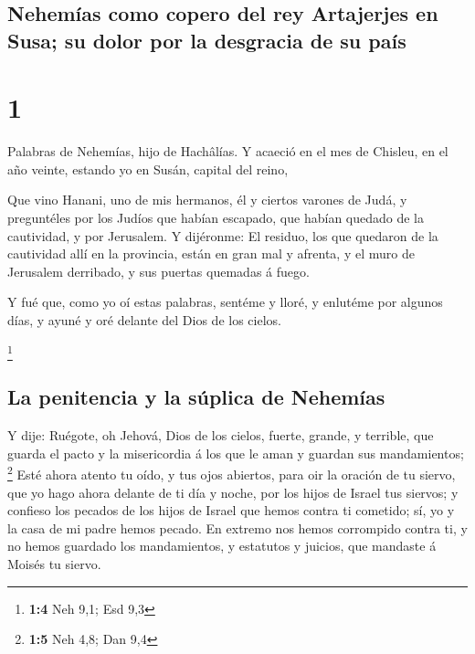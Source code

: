 \hypertarget{nehemuxedas-como-copero-del-rey-artajerjes-en-susa-su-dolor-por-la-desgracia-de-su-pauxeds}{%
\subsection{Nehemías como copero del rey Artajerjes en Susa; su dolor
por la desgracia de su
país}\label{nehemuxedas-como-copero-del-rey-artajerjes-en-susa-su-dolor-por-la-desgracia-de-su-pauxeds}}

\hypertarget{section}{%
\section{1}\label{section}}

 Palabras de Nehemías, hijo de Hachâlías. Y acaeció en el
mes de Chisleu, en el año veinte, estando yo en Susán, capital del
reino,

 Que vino Hanani, uno de mis hermanos, él y ciertos
varones de Judá, y preguntéles por los Judíos que habían escapado, que
habían quedado de la cautividad, y por Jerusalem.  Y
dijéronme: El residuo, los que quedaron de la cautividad allí en la
provincia, están en gran mal y afrenta, y el muro de Jerusalem
derribado, y sus puertas quemadas á fuego.

 Y fué que, como yo oí estas palabras, sentéme y lloré, y
enlutéme por algunos días, y ayuné y oré delante del Dios de los cielos.

\footnote{\textbf{1:4} Neh 9,1; Esd 9,3}

\hypertarget{la-penitencia-y-la-suxfaplica-de-nehemuxedas}{%
\subsection{La penitencia y la súplica de
Nehemías}\label{la-penitencia-y-la-suxfaplica-de-nehemuxedas}}

 Y dije: Ruégote, oh Jehová, Dios de los cielos, fuerte,
grande, y terrible, que guarda el pacto y la misericordia á los que le
aman y guardan sus mandamientos; \footnote{\textbf{1:5} Neh 4,8; Dan 9,4}
 Esté ahora atento tu oído, y tus ojos abiertos, para oir
la oración de tu siervo, que yo hago ahora delante de ti día y noche,
por los hijos de Israel tus siervos; y confieso los pecados de los hijos
de Israel que hemos contra ti cometido; sí, yo y la casa de mi padre
hemos pecado.  En extremo nos hemos corrompido contra ti,
y no hemos guardado los mandamientos, y estatutos y juicios, que
mandaste á Moisés tu siervo.

